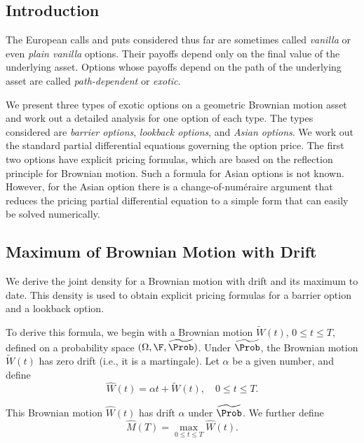 \subsection{Introduction}
The European calls and puts considered thus far are sometimes called \textit{vanilla} or even \textit{plain vanilla} options. Their payoffs depend only on the final value of the underlying asset. Options whose payoffs depend on the path of the underlying asset are called \textit{path-dependent} or \textit{exotic}.

We present three types of exotic options on a geometric Brownian motion asset and work out a detailed analysis for one option of each type. The types considered are \textit{barrier options}, \textit{lookback options}, and \textit{Asian options}. We work out the standard partial differential equations governing the option price. The first two options have explicit pricing formulas, which are based on the reflection principle for Brownian motion. Such a formula for Asian options is not known. However, for the Asian option there is a change-of-num\'{e}raire argument that reduces the pricing partial differential equation to a simple form that can easily be solved numerically.

\subsection{Maximum of Brownian Motion with Drift}

We derive the joint density for a Brownian motion with drift and its maximum to date. This density is used to obtain explicit pricing formulas for a barrier option and a lookback option.

To derive this formula, we begin with a Brownian motion $\widetilde{W}(t)$, $0 \le t \le T$, defined on a probability space $(\Omega, \F, \widetilde{\Prob})$. Under $\widetilde{\Prob}$, the Brownian motion $\widetilde{W}(t)$ has zero drift (i.e., it is a martingale). Let $\alpha$ be a given number, and define
\begin{equation}
	\widehat{W}(t) = \alpha t + \widetilde{W}(t), \quad 0 \le t \le T.
	\label{eq:DriftBrownianDef}
\end{equation}

This Brownian motion $\widehat{W}(t)$ has drift $\alpha$ under $\widetilde{\Prob}$. We further define
\begin{equation}
	\widehat{M}(T) = \max_{0 \le t \le T} \widehat{W}(t).
	\label{eq:MaxProcessDef}
\end{equation}

